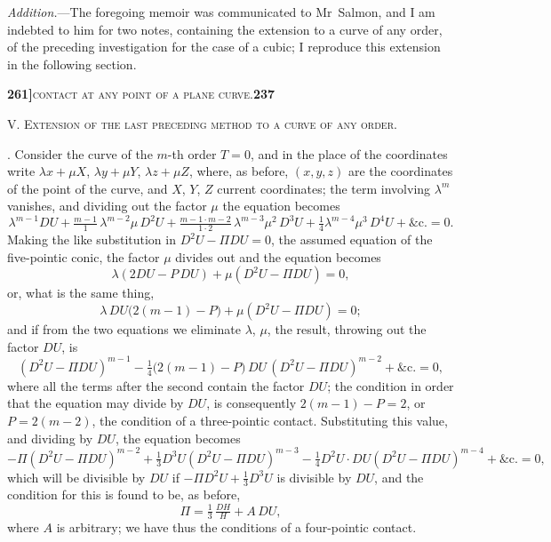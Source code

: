\documentclass[11pt]{article}
\begin{document}
\medskip

\noindent\textit{Addition.}---The foregoing memoir was communicated to Mr~Salmon, and I am indebted to him for two notes, containing the extension to a curve of any order, of the preceding investigation for the case of a cubic; I reproduce this extension in the following section.

\newpage
\noindent\textbf{261]}\hfill\textsc{contact at any point of a plane curve.}\hfill\textbf{237}

\bigskip

\begin{center}
\textsc{V. Extension of the last preceding method to a curve of any order.}
\end{center}

\medskip

. Consider the curve of the $m$-th order $T = 0$, and in the place of the coordinates write $\lambda x + \mu X$, $\lambda y + \mu Y$, $\lambda z + \mu Z$, where, as before, $(x, y, z)$ are the coordinates of the point of the curve, and $X$, $Y$, $Z$ current coordinates; the term involving $\lambda^m$ vanishes, and dividing out the factor $\mu$ the equation becomes
\[
  \lambda^{m-1} DU + \tfrac{m-1}{1}\,\lambda^{m-2}\mu\,D^2 U + \tfrac{m-1\cdot m-2}{1\cdot 2}\,\lambda^{m-3}\mu^2\,D^3 U + \tfrac{1}{4}\lambda^{m-4}\mu^3\,D^4 U + \&\text{c.} = 0.
\]
Making the like substitution in $D^2 U - \Pi DU = 0$, the assumed equation of the five-pointic conic, the factor $\mu$ divides out and the equation becomes
\[
  \lambda(2 DU - P\,DU) + \mu(D^2 U - \Pi DU) = 0,
\]
or, what is the same thing,
\[
  \lambda\,DU\bigl(2(m - 1) - P\bigr) + \mu(D^2 U - \Pi DU) = 0;
\]
and if from the two equations we eliminate $\lambda$, $\mu$, the result, throwing out the factor $DU$, is
\[
  (D^2 U - \Pi DU)^{m-1} - \tfrac{1}{4}\bigl(2(m - 1) - P\bigr)\,D U\,(D^2 U - \Pi DU)^{m-2} + \&\text{c.} = 0,
\]
where all the terms after the second contain the factor $DU$; the condition in order that the equation may divide by $DU$, is consequently $2(m - 1) - P = 2$, or $P = 2(m - 2)$, the condition of a three-pointic contact. Substituting this value, and dividing by $DU$, the equation becomes
\[
  -\Pi(D^2 U - \Pi DU)^{m-2} + \tfrac{1}{3} D^3 U(D^2 U - \Pi DU)^{m-3} - \tfrac{1}{4} D^2 U\cdot DU(D^2 U - \Pi DU)^{m-4} + \&\text{c.} = 0,
\]
which will be divisible by $DU$ if $-\Pi D^2 U + \tfrac{1}{3} D^3 U$ is divisible by $DU$, and the condition for this is found to be, as before,
\[
  \Pi = \tfrac{1}{3}\,\tfrac{DH}{H} + A\,DU,
\]
where $A$ is arbitrary; we have thus the conditions of a four-pointic contact.
\end{document}
